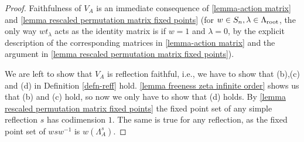 \begin{proof}  

    Faithfulness of $V_A$ is an immediate consequence of \cref{lemma-action matrix} and \cref{lemma rescaled permutation matrix fixed points} (for $w\in S_n, \lambda \in \Lambda_{\operatorname{root}}$, the only way $wt_\lambda$ acts as the identity matrix is if $w=1$ and $\lambda=0$, by the explicit description of the corresponding matrices in \cref{lemma-action matrix} and the argument in \cref{lemma rescaled permutation matrix fixed points}).

    We are left to show that $V_A$ is reflection faithful, i.e., we have to show that (b),(c) and (d) in Definition \ref{defn-reff} hold.
    \cref{lemma freeness zeta infinite order} shows us that (b) and (c) hold, so now we only have to show that (d) holds. By \cref{lemma rescaled permutation matrix fixed points} the fixed point set of any simple reflection $s$ has codimension $1$. The same is true for any reflection, as the fixed point set of $w s w^{-1}$ is $w(\Lambda_A^{s})$. 
    
    
    

\end{proof}
